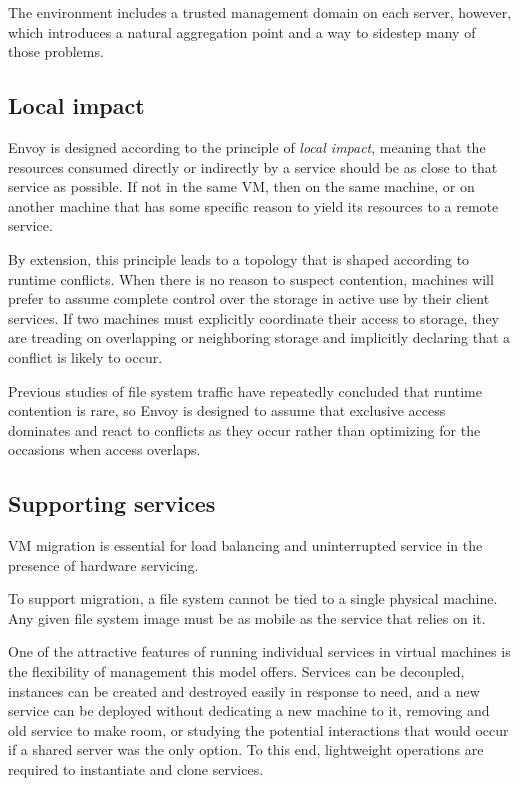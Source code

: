 The environment includes a trusted management domain on each server, however, which introduces a natural aggregation point and a way to sidestep many of those problems.

\subsection{Local impact}

Envoy is designed according to the principle of \textit{local impact}, meaning that the resources consumed directly or indirectly by a service should be as close to that service as possible. If not in the same VM, then on the same machine, or on another machine that has some specific reason to yield its resources to a remote service.

By extension, this principle leads to a topology that is shaped according to runtime conflicts. When there is no reason to suspect contention, machines will prefer to assume complete control over the storage in active use by their client services. If two machines must explicitly coordinate their access to storage, they are treading on overlapping or neighboring storage and implicitly declaring that a conflict is likely to occur.

Previous studies of file system traffic have repeatedly concluded that runtime contention is rare, so Envoy is designed to assume that exclusive access dominates and react to conflicts as they occur rather than optimizing for the occasions when access overlaps.

\subsection{Supporting services}

VM migration \cite{clark} is essential for load balancing and uninterrupted service in the presence of hardware servicing.

To support migration, a file system cannot be tied to a single physical machine. Any given file system image must be as mobile as the service that relies on it.

One of the attractive features of running individual services in virtual machines is the flexibility of management this model offers. Services can be decoupled, instances can be created and destroyed easily in response to need, and a new service can be deployed without dedicating a new machine to it, removing and old service to make room, or studying the potential interactions that would occur if a shared server was the only option. To this end, lightweight operations are required to instantiate and clone services.

